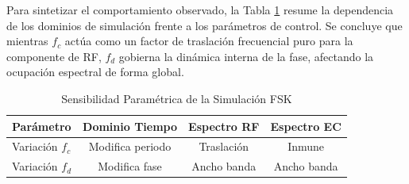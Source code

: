 Para sintetizar el comportamiento observado, la Tabla \ref{tab:resumen_fsk} resume la dependencia de los dominios de simulación frente a los parámetros de control. Se concluye que mientras $f_c$ actúa como un factor de traslación frecuencial puro para la componente de RF, $f_d$ gobierna la dinámica interna de la fase, afectando la ocupación espectral de forma global.

\begin{table}[h]
\centering
\caption{Sensibilidad Paramétrica de la Simulación FSK}
\label{tab:resumen_fsk}
\begin{tabular}{|l|c|c|c|}
\hline
\textbf{Parámetro} & \textbf{Dominio Tiempo} & \textbf{Espectro RF} & \textbf{Espectro EC} \\ \hline
Variación $f_c$ & Modifica periodo & Traslación & Inmune \\ \hline
Variación $f_d$ & Modifica fase & Ancho banda & Ancho banda \\ \hline
\end{tabular}
\end{table}